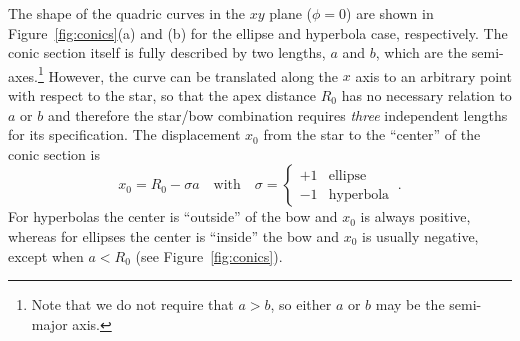 

The shape of the quadric curves in the \(xy\) plane (\(\phi = 0\)) are
shown in Figure~\ref{fig:conics}(a) and (b) for the ellipse and
hyperbola case, respectively.  The conic section itself is fully
described by two lengths, \(a\) and \(b\), which are the
semi-axes.\footnote{Note that we do not require that \(a > b\), so
  either \(a\) or \(b\) may be the semi-major axis.}  However, the
curve can be translated along the \(x\) axis to an arbitrary point
with respect to the star, so that the apex distance \(R_0\) has no
necessary relation to \(a\) or \(b\) and therefore the star/bow
combination requires \emph{three} independent lengths for its
specification.  The displacement \(x_0\) from the star to the
``center'' of the conic section is
\begin{equation}
  \label{eq:conic-x0}
  x_0 = R_0 - \sigma a
  \quad \text{with} \quad
  \sigma = \begin{cases}
    +1 & \text{ellipse}\\
    -1 & \text{hyperbola}
  \end{cases} \ .
\end{equation}
For hyperbolas the center is ``outside'' of the bow and \(x_0\) is
always positive, whereas for ellipses the center is ``inside'' the bow
and \(x_0\) is usually negative, except when \(a < R_0\) (see
Figure~\ref{fig:conics}).

